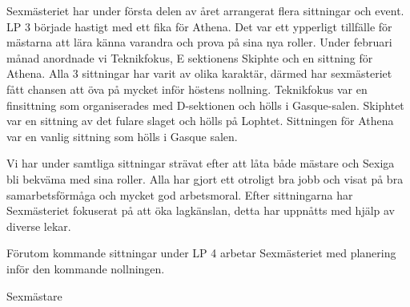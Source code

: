 \documentclass[../_main/handlingar.tex]{subfiles}
\begin{document}
Sexmästeriet har under första delen av året arrangerat flera sittningar och event. LP 3 började hastigt med ett fika för Athena. Det var ett ypperligt tillfälle för mästarna att lära känna varandra och prova på sina nya roller. Under februari månad anordnade vi Teknikfokus, E sektionens Skiphte och en sittning för Athena. Alla 3 sittningar har varit av olika karaktär, därmed har sexmästeriet fått chansen att öva på mycket inför höstens nollning. Teknikfokus var en finsittning som organiserades med D-sektionen och hölls i Gasque-salen. Skiphtet var en sittning av det fulare slaget och hölls på Lophtet. Sittningen för Athena var en vanlig sittning som hölls i Gasque salen.

Vi har under samtliga sittningar strävat efter att låta både mästare och Sexiga bli bekväma med sina roller. Alla har gjort ett otroligt bra jobb och visat på bra samarbetsförmåga och mycket god arbetsmoral. Efter sittningarna har Sexmästeriet fokuserat på att öka lagkänslan, detta har uppnåtts med hjälp av diverse lekar.

Förutom kommande sittningar under LP 4 arbetar Sexmästeriet med planering inför den kommande nollningen.
\begin{signatures}{1}
    \mvh
    \signature{Alexander Wik}{Sexmästare}
\end{signatures}
\end{document}
